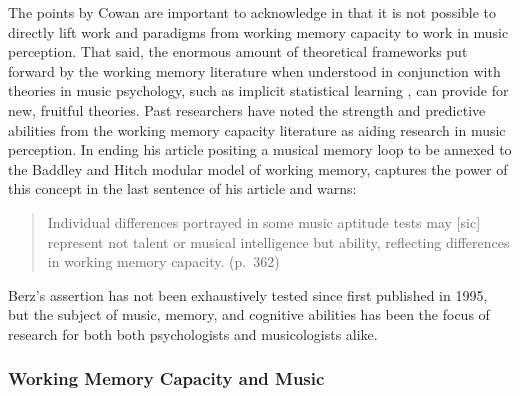 \documentclass[12pt,]{book}
\begin{document}
The points by Cowan are important to acknowledge in that it is not possible to directly lift work and paradigms from working memory capacity to work in music perception.
That said, the enormous amount of theoretical frameworks put forward by the working memory literature when understood in conjunction with theories in music psychology, such as implicit statistical learning \citep{saffranStatisticalLearningTone1999}, can provide for new, fruitful theories.
Past researchers have noted the strength and predictive abilities from the working memory capacity literature as aiding research in music perception.
In ending his article positing a musical memory loop to be annexed to the Baddley and Hitch modular model of working memory, \citet{berzWorkingMemoryMusic1995} captures the power of this concept in the last sentence of his article and warns:

\begin{quote}
Individual differences portrayed in some music aptitude tests may {[}sic{]} represent not talent or musical intelligence but ability, reflecting differences in working memory capacity. (p.~362)
\end{quote}

Berz's assertion has not been exhaustively tested since first published in 1995, but the subject of music, memory, and cognitive abilities has been the focus of research for both both psychologists and musicologists alike.

\hypertarget{working-memory-capacity-and-music}{%
\subsubsection{Working Memory Capacity and Music}\label{working-memory-capacity-and-music}}
\end{document}
